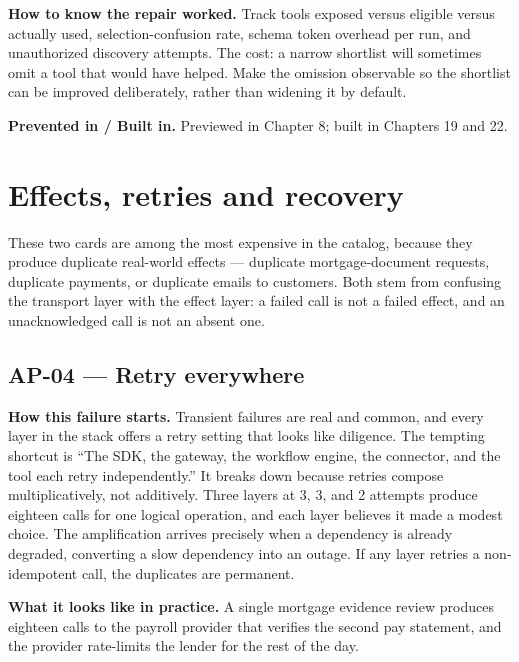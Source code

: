 \textbf{How to know the repair worked.} Track tools exposed versus eligible versus actually used, selection-confusion rate, schema token overhead per run, and unauthorized discovery attempts. The cost: a narrow shortlist will sometimes omit a tool that would have helped. Make the omission observable so the shortlist can be improved deliberately, rather than widening it by default.\par

\textbf{Prevented in / Built in.} Previewed in Chapter 8; built in Chapters 19 and 22.\par

\section{Effects, retries and recovery}

These two cards are among the most expensive in the catalog, because they produce duplicate real-world effects — duplicate mortgage-document requests, duplicate payments, or duplicate emails to customers. Both stem from confusing the transport layer with the effect layer: a failed call is not a failed effect, and an unacknowledged call is not an absent one.\par


\subsection{AP-04 — Retry everywhere}

\textbf{How this failure starts.} Transient failures are real and common, and every layer in the stack offers a retry setting that looks like diligence. The tempting shortcut is “The SDK, the gateway, the workflow engine, the connector, and the tool each retry independently.” It breaks down because retries compose multiplicatively, not additively. Three layers at 3, 3, and 2 attempts produce eighteen calls for one logical operation, and each layer believes it made a modest choice. The amplification arrives precisely when a dependency is already degraded, converting a slow dependency into an outage. If any layer retries a non-idempotent call, the duplicates are permanent.\par

\textbf{What it looks like in practice.} A single mortgage evidence review produces eighteen calls to the payroll provider that verifies the second pay statement, and the provider rate-limits the lender for the rest of the day.\par

